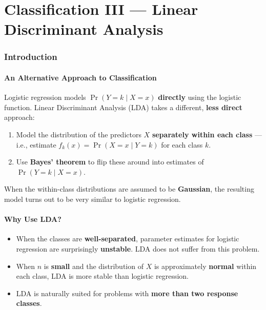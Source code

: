 \documentclass[11pt,a4paper]{article}
\theoremstyle{definition}
\theoremstyle{plain}
\theoremstyle{remark}
\begin{document}
\part{Classification III --- Linear Discriminant Analysis}

\section{Introduction}

\subsection{An Alternative Approach to Classification}

Logistic regression models $\Pr(Y = k \mid X = x)$ \textbf{directly} using the logistic function. Linear Discriminant Analysis (LDA) takes a different, \textbf{less direct} approach:
\begin{enumerate}
    \item Model the distribution of the predictors $X$ \textbf{separately within each class} — i.e., estimate $f_k(x) = \Pr(X = x \mid Y = k)$ for each class $k$.
    \item Use \textbf{Bayes' theorem} to flip these around into estimates of $\Pr(Y = k \mid X = x)$.
\end{enumerate}

When the within-class distributions are assumed to be \textbf{Gaussian}, the resulting model turns out to be very similar to logistic regression.

\subsection{Why Use LDA?}

\begin{tcolorbox}[colback=blue!5!white,colframe=blue!75!black,title=\textbf{Advantages of LDA over Logistic Regression}]
\begin{itemize}
    \item When the classes are \textbf{well-separated}, parameter estimates for logistic regression are surprisingly \textbf{unstable}. LDA does not suffer from this problem.
    \item When $n$ is \textbf{small} and the distribution of $X$ is approximately \textbf{normal} within each class, LDA is more stable than logistic regression.
    \item LDA is naturally suited for problems with \textbf{more than two response classes}.
\end{itemize}
\end{tcolorbox}
\end{document}
